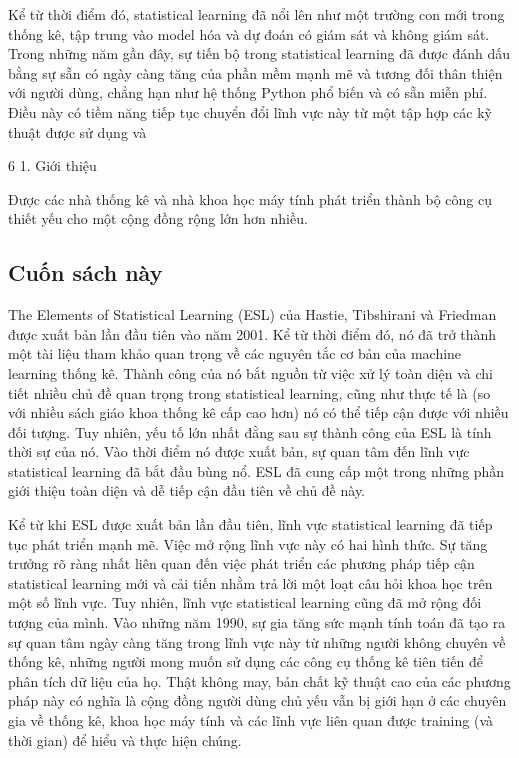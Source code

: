 Kể từ thời điểm đó, statistical learning đã nổi lên như một trường con mới trong thống kê, tập trung vào model hóa và dự đoán có giám sát và không giám sát. Trong những năm gần đây, sự tiến bộ trong statistical learning đã được đánh dấu bằng sự sẵn có ngày càng tăng của phần mềm mạnh mẽ và tương đối thân thiện với người dùng, chẳng hạn như hệ thống Python phổ biến và có sẵn miễn phí. Điều này có tiềm năng tiếp tục chuyển đổi lĩnh vực này từ một tập hợp các kỹ thuật được sử dụng và

6 1. Giới thiệu

Được các nhà thống kê và nhà khoa học máy tính phát triển thành bộ công cụ thiết yếu cho một cộng đồng rộng lớn hơn nhiều.

\subsection{Cuốn sách này}

The Elements of Statistical Learning (ESL) của Hastie, Tibshirani và Friedman được xuất bản lần đầu tiên vào năm 2001. Kể từ thời điểm đó, nó đã trở thành một tài liệu tham khảo quan trọng về các nguyên tắc cơ bản của machine learning thống kê. Thành công của nó bắt nguồn từ việc xử lý toàn diện và chi tiết nhiều chủ đề quan trọng trong statistical learning, cũng như thực tế là (so với nhiều sách giáo khoa thống kê cấp cao hơn) nó có thể tiếp cận được với nhiều đối tượng. Tuy nhiên, yếu tố lớn nhất đằng sau sự thành công của ESL là tính thời sự của nó. Vào thời điểm nó được xuất bản, sự quan tâm đến lĩnh vực statistical learning đã bắt đầu bùng nổ. ESL đã cung cấp một trong những phần giới thiệu toàn diện và dễ tiếp cận đầu tiên về chủ đề này.

Kể từ khi ESL được xuất bản lần đầu tiên, lĩnh vực statistical learning đã tiếp tục phát triển mạnh mẽ. Việc mở rộng lĩnh vực này có hai hình thức. Sự tăng trưởng rõ ràng nhất liên quan đến việc phát triển các phương pháp tiếp cận statistical learning mới và cải tiến nhằm trả lời một loạt câu hỏi khoa học trên một số lĩnh vực. Tuy nhiên, lĩnh vực statistical learning cũng đã mở rộng đối tượng của mình. Vào những năm 1990, sự gia tăng sức mạnh tính toán đã tạo ra sự quan tâm ngày càng tăng trong lĩnh vực này từ những người không chuyên về thống kê, những người mong muốn sử dụng các công cụ thống kê tiên tiến để phân tích dữ liệu của họ. Thật không may, bản chất kỹ thuật cao của các phương pháp này có nghĩa là cộng đồng người dùng chủ yếu vẫn bị giới hạn ở các chuyên gia về thống kê, khoa học máy tính và các lĩnh vực liên quan được training (và thời gian) để hiểu và thực hiện chúng.

